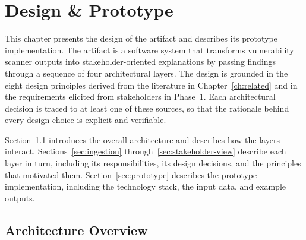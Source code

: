 \chapter{Design \& Prototype}%
\label{ch:designandprototype}

This chapter presents the design of the artifact and describes its prototype implementation. The artifact is a software system that transforms vulnerability scanner outputs into stakeholder-oriented explanations by passing findings through a sequence of four architectural layers. The design is grounded in the eight design principles derived from the literature in Chapter~\ref{ch:related} and in the requirements elicited from stakeholders in Phase~1. Each architectural decision is traced to at least one of these sources, so that the rationale behind every design choice is explicit and verifiable.

Section~\ref{sec:architecture-overview} introduces the overall architecture and describes how the layers interact. Sections~\ref{sec:ingestion} through~\ref{sec:stakeholder-view} describe each layer in turn, including its responsibilities, its design decisions, and the principles that motivated them. Section~\ref{sec:prototype} describes the prototype implementation, including the technology stack, the input data, and example outputs.

\section{Architecture Overview}
\label{sec:architecture-overview}

